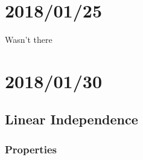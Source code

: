 \documentclass[12pt]{article}
\begin{document}
\section{2018/01/25}

Wasn't there

\section{2018/01/30}	

\subsection{Linear Independence}

\subsubsection{Properties}
\end{document}

